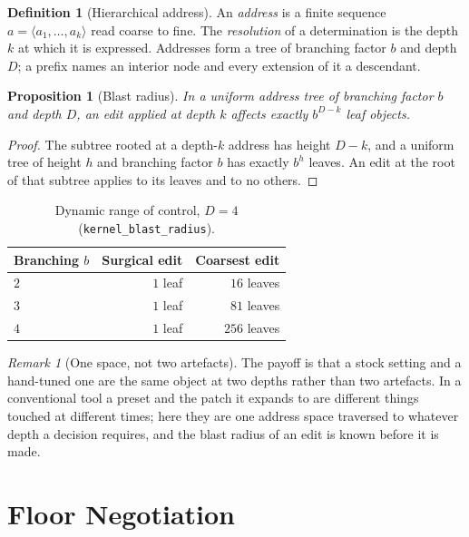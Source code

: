 \documentclass[11pt,twocolumn,a4paper]{article}
\newtheorem{proposition}[theorem]{Proposition}
\theoremstyle{definition}
\newtheorem{definition}[theorem]{Definition}
\theoremstyle{remark}
\newtheorem{remark}[theorem]{Remark}
\begin{document}
\begin{definition}[Hierarchical address]
\label{def:address}
An \emph{address} is a finite sequence $a=\langle a_1,\dots,a_k\rangle$ read
coarse to fine. The \emph{resolution} of a determination is the depth $k$ at
which it is expressed. Addresses form a tree of branching factor $b$ and depth
$D$; a prefix names an interior node and every extension of it a descendant.
\end{definition}

\begin{proposition}[Blast radius]
\label{prop:blast}
In a uniform address tree of branching factor $b$ and depth $D$, an edit applied
at depth $k$ affects exactly $b^{D-k}$ leaf objects.
\end{proposition}

\begin{proof}
The subtree rooted at a depth-$k$ address has height $D-k$, and a uniform tree of
height $h$ and branching factor $b$ has exactly $b^{h}$ leaves. An edit at the
root of that subtree applies to its leaves and to no others.
\end{proof}

\begin{table}[H]
\centering
\small
\caption{Dynamic range of control, $D=4$
(\texttt{kernel\_blast\_radius}).}
\label{tab:blast}
\begin{tabular}{@{}lrr@{}}
\toprule
Branching $b$ & Surgical edit & Coarsest edit \\
\midrule
$2$ & $1$ leaf & $16$ leaves \\
$3$ & $1$ leaf & $81$ leaves \\
$4$ & $1$ leaf & $256$ leaves \\
\bottomrule
\end{tabular}
\end{table}

\begin{remark}[One space, not two artefacts]
\label{rem:one-space}
The payoff is that a stock setting and a hand-tuned one are the same object at
two depths rather than two artefacts. In a conventional tool a preset and the
patch it expands to are different things touched at different times; here they
are one address space traversed to whatever depth a decision requires, and the
blast radius of an edit is known before it is made.
\end{remark}

\section{Floor Negotiation}
\label{sec:negotiation}
\end{document}
